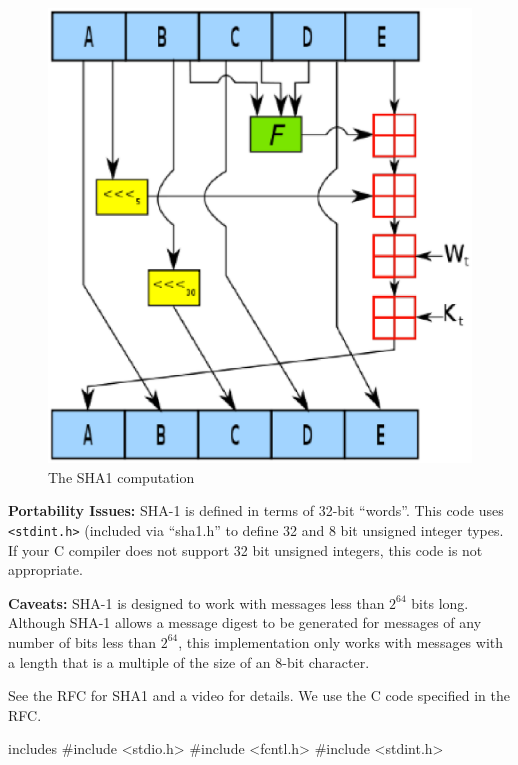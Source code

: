 \begin{figure}[ht!]
\centering
\includegraphics[scale=1.0]{eps/sha1pic.eps}
\caption{The SHA1 computation}
\label{sha1pic}
\end{figure}

\vspace{1mm}
\noindent
{\bf Portability Issues:}
SHA-1 is defined in terms of 32-bit ``words''.  This code
uses \verb|<stdint.h>| (included via ``sha1.h'' to define 32 and 8
bit unsigned integer types.  If your C compiler does not
support 32 bit unsigned integers, this code is not
appropriate.

\vspace{1mm}
\noindent
{\bf Caveats:}
SHA-1 is designed to work with messages less than $2^{64}$ bits
long.  Although SHA-1 allows a message digest to be generated
for messages of any number of bits less than $2^{64}$, this
implementation only works with messages with a length that is
a multiple of the size of an 8-bit character.

\vspace{1mm}
\noindent
See the RFC for SHA1\cite{30} and a video\cite{29} for details.
We use the C code specified in the RFC.

\begin{chunk}{includes}
#include <stdio.h>
#include <fcntl.h>
#include <stdint.h>

\end{chunk}


